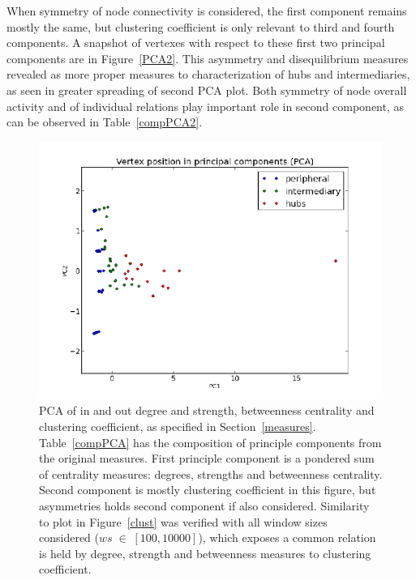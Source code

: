 \documentclass[%
 aip,
 jmp,%
 amsmath,amssymb,
 reprint,%
]{revtex4-1}
\begin{document}
When symmetry of node connectivity is considered, the first component remains mostly the same, but clustering coefficient is only relevant to third and fourth components. A snapshot of vertexes with respect to these first two principal components are in Figure~\ref{PCA2}. This asymmetry and disequilibrium measures revealed as more proper measures to characterization of hubs and intermediaries, as seen in greater spreading of second PCA plot. Both symmetry of node overall activity and of individual relations play important role in second component, as can be observed in Table~\ref{compPCA2}.


\begin{figure} 
   \centering
        \includegraphics[width=\columnwidth]{figs/ev0pr3PCA}
    \caption{PCA of in and out degree and strength, betweenness centrality and clustering coefficient, as specified in Section~\ref{measures}. Table~\ref{compPCA} has the composition of principle components from the original measures. First principle component is a pondered sum of centrality measures: degrees, strengths and betweenness centrality. Second component is mostly clustering coefficient in this figure, but asymmetries holds second component if also considered. Similarity to plot in Figure~\ref{clust} was verified with all window sizes considered ($ws\;\in\;[100,10000]$), which exposes a common relation is held by degree, strength and betweenness measures to clustering coefficient.}
    \label{PCA}
\end{figure}
\end{document}
